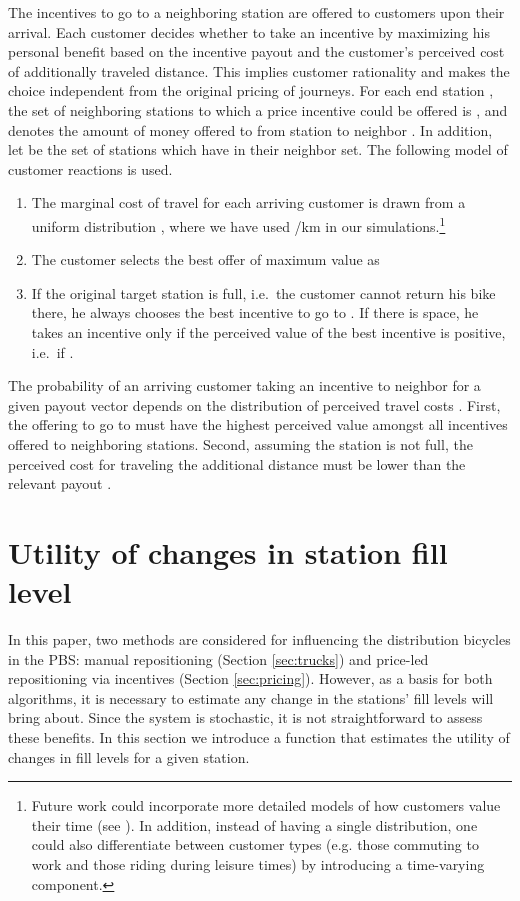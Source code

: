 \documentclass{article}
\begin{document}
The incentives to go to a neighboring station are offered to customers upon
their arrival. Each customer decides whether to take an incentive by maximizing
his personal benefit based on the incentive payout and the customer's perceived
cost of additionally traveled distance. This implies customer rationality and
makes the choice independent from the original pricing of journeys. For each end
station , the set of neighboring stations to which a 
price incentive could be offered is , and  denotes the amount of money
offered to from station  to neighbor . In addition, let  be the set of stations  which have  in their neighbor set. The
following model of customer reactions is used.
\begin{enumerate}
\item The marginal cost of travel  for each arriving customer is drawn from a
  uniform distribution , where we have used
  /km in our simulations.\footnote{Future work could
    incorporate more detailed models of how customers value
    their time (see \cite{mackie2001value, hess2005estimation}). In addition, instead
    of having a single distribution, one could also differentiate between
    customer types (e.g. those commuting to work and those riding during leisure
    times) by introducing a time-varying component.}
\item The customer selects the best offer of maximum value as
  
\item If the original target station is full, i.e.\ the customer cannot return
  his bike there, he always chooses the best incentive to go to . If there
  is space, he takes an incentive only if the perceived value of the best
  incentive is positive, i.e.\ if .
\end{enumerate}
The probability  of an arriving customer taking an incentive to
neighbor  for a given payout vector  depends on the distribution of
perceived travel costs . First, the offering to go to  must have the
highest perceived value amongst all incentives offered to neighboring stations.
Second, assuming the station  is not full, the perceived cost for traveling
the additional distance must be lower than the relevant payout .


\section{Utility of changes in station fill level}
\label{sec:utility}
In this paper, two methods are considered for influencing the distribution
bicycles in the PBS: manual repositioning (Section \ref{sec:trucks}) and
price-led repositioning via incentives (Section \ref{sec:pricing}). However, as
a basis for both algorithms, it is necessary to estimate any change in the
stations' fill levels will bring about. Since the system is stochastic, it is
not straightforward to assess these benefits. In this section we introduce a
function that estimates the utility of changes in fill levels for a given
station.
\end{document}
